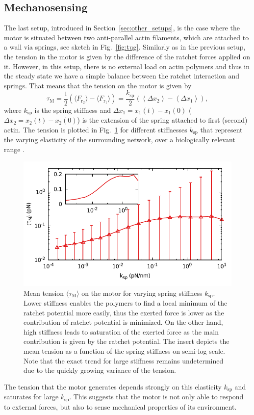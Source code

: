 \documentclass[aps,pre,twocolumn,showpacs,showkeys,superscriptaddress,floatfix]{revtex4-1}
\begin{document}
\subsection{Mechanosensing}
\label{sec:mechanosensing}
The last setup, introduced in Section~\ref{sec:other_setups}, is the case where the motor is situated between two anti-parallel actin filaments, which are attached to a wall via springs, see sketch in Fig.~\ref{fig:tug}. 
Similarly as in the previous setup, the tension in the motor is given by the difference of the ratchet forces applied on it.
However, in this setup, there is no external load on actin polymers and thus in the steady state we have a simple balance between the ratchet interaction and springs. 
That means that the tension on the motor is given by
\[
\tau_\text{M} 
= \frac{1}{2} \left(  \langle F_{\text{r}_2}\rangle - \langle F_{\text{r}_1} \rangle \right)
= \frac{k_\text{sp}}{2} \left( \left\langle \Delta x_2 \right\rangle - \left\langle \Delta x_1 \right\rangle \right) ,
\]
where $k_\text{sp}$ is the spring stiffness and $\Delta x_1 = x_1(t) - x_1(0)$ ($\Delta x_2 = x_2(t) - x_2(0)$) is the extension of the spring attached to first (second) actin. 
The tension is plotted in Fig.~\ref{fig:tug_k} for different stiffnesses $k_\text{sp}$ that represent the varying elasticity of the surrounding network, 
over a biologically relevant range \cite{schwarz2006focal,prager2011fibroblast}.
\begin{figure}[t]
\centering
\includegraphics[width=0.9\linewidth,height=!]{tug_k}
\caption{
\label{fig:tug_k}
Mean tension $\langle \tau_\text{M} \rangle$ on the motor for varying spring stiffness $k_\text{sp}$.
Lower stiffness enables the polymers to find a local minimum of the ratchet potential more easily, 
thus the exerted force is lower as the contribution of ratchet potential is minimized. 
On the other hand, high stiffness leads to saturation of the exerted force as the main contribution is given by the ratchet potential. 
The insert depicts the mean tension as a function of the spring stiffness on semi-log scale. 
Note that the exact trend for large stiffness remains undetermined due to the quickly growing variance of the tension. 
}
\end{figure}
The tension that the motor generates depends strongly on this elasticity $k_\text{sp}$ and saturates for large $k_\text{sp}$. 
This suggests that the motor is not only able to respond to external forces, but also to sense mechanical properties of its environment.
\end{document}
